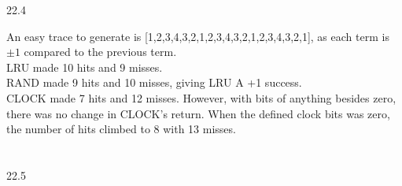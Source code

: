\documentclass[12pt, a4paper]{article}
\begin{document}
	22.4
	
		An easy trace to generate is [1,2,3,4,3,2,1,2,3,4,3,2,1,2,3,4,3,2,1], as each term is \(\pm 1\) compared to the previous term.\\
		LRU made 10 hits and 9 misses.\\
		RAND made 9 hits and 10 misses, giving LRU A +1 success.\\
		CLOCK made 7 hits and 12 misses. However, with bits of anything besides zero, there was no change in CLOCK's return. When the defined clock bits was zero, the number of hits climbed to 8 with 13 misses.\\ \\ \\
		
	
	
	22.5
\end{document}
